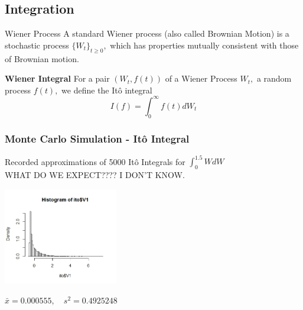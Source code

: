 \subsection{Integration}


\begin{frame}{Wiener Process}
A standard Wiener process (also called Brownian Motion) is a stochastic process $\{W_t\}_{t \geq 0},$ which has properties mutually consistent with those of Brownian motion.

\vfill

\textbf{Wiener Integral} For a pair $(W_t,f(t))$ of a Wiener Process $W_t,$ a random process $f(t),$ we define the It\^o integral 
	$$I(f)=\int_0^{\infty} f(t)dW_t$$
\end{frame}

\begin{frame}
   \frametitle{Monte Carlo Simulation - It\^o Integral}
	Recorded approximations of 5000 It\^o Integrals for $\int^{1.5}_{0} W dW$\\
	WHAT DO WE EXPECT???? I DON'T KNOW. \\
	\begin{center}
		\includegraphics[width=5cm]{img/ito}\\
	\end{center}
	\begin{center}
	$\bar{x}=0.000555,\hspace{1em} s^{2}=0.4925248$%

	\end{center} 
\end{frame}


